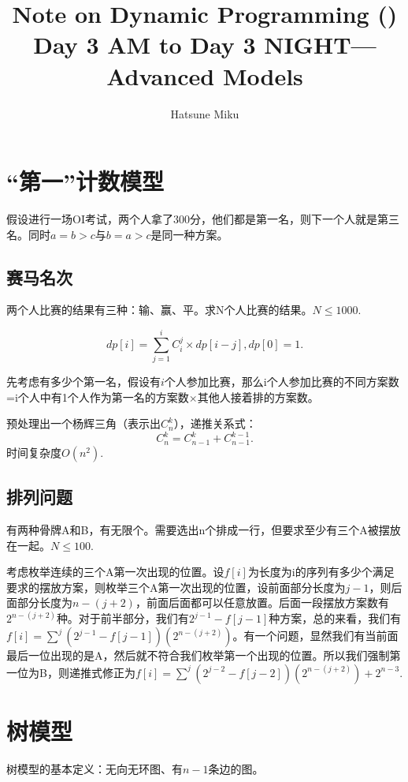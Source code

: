 \documentclass{article}
\newcommand{\romannum}[1]{\uppercase\expandafter{\romannumeral#1}}
\begin{document}
\title{Note on Dynamic Programming (\romannum{3})\\\large{Day 3 AM to Day 3 NIGHT---Advanced Models}}\date{}\author{Hatsune Miku}
\maketitle
\tableofcontents
\newpage

\section{“第一”计数模型}
假设进行一场OI考试，两个人拿了300分，他们都是第一名，则下一个人就是第三名。同时$a=b>c$与$b=a>c$是同一种方案。
\subsection{赛马名次}
两个人比赛的结果有三种：输、赢、平。求N个人比赛的结果。$N\le 1000.$

\begin{equation*}
    dp[i]=\sum_{j=1}^i C_i^j\times dp[i-j],dp[0]=1.
\end{equation*}

先考虑有多少个第一名，假设有$i$个人参加比赛，那么i个人参加比赛的不同方案数=i个人中有1个人作为第一名的方案数$\times$其他人接着排的方案数。

预处理出一个杨辉三角（表示出$C_n^k$），递推关系式：
\begin{equation*}
    C_n^k=C_{n-1}^k+C_{n-1}^{k-1}.
\end{equation*}
时间复杂度$O(n^2)$.
\subsection{排列问题}
有两种骨牌A和B，有无限个。需要选出n个排成一行，但要求至少有三个A被摆放在一起。$N\le 100.$

考虑枚举连续的三个A第一次出现的位置。设$f[i]$为长度为i的序列有多少个满足要求的摆放方案，则枚举三个A第一次出现的位置，设前面部分长度为$j-1$，则后面部分长度为$n-(j+2)$，前面后面都可以任意放置。后面一段摆放方案数有$2^{n-(j+2)}$种。对于前半部分，我们有$2^{j-1}-f[j-1]$种方案，总的来看，我们有$f[i]=\sum^j(2^{j-1}-f[j-1])(2^{n-(j+2)})$。有一个问题，显然我们有当前面最后一位出现的是A，然后就不符合我们枚举第一个出现的位置。所以我们强制第一位为B，则递推式修正为$f[i]=\sum^j(2^{j-2}-f[j-2])(2^{n-(j+2)})+2^{n-3}$.
\section{树模型}
树模型的基本定义：无向无环图、有$n-1$条边的图。
\end{document}
